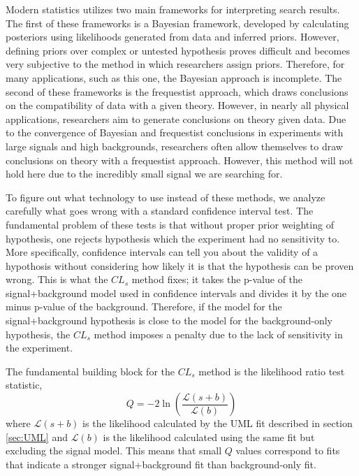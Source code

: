 Modern statistics utilizes two main frameworks for interpreting search results. The first of these frameworks is a Bayesian framework, developed by calculating posteriors using likelihoods generated from data and inferred priors. However, defining priors over complex or untested hypothesis proves difficult and becomes very subjective to the method in which researchers assign priors. Therefore, for many applications, such as this one, the Bayesian approach is incomplete. The second of these frameworks is the frequestist approach, which draws conclusions on the compatibility of data with a given theory. However, in nearly all physical applications, researchers aim to generate conclusions on theory given data. Due to the convergence of Bayesian and frequestist conclusions in experiments with large signals and high backgrounds, researchers often allow themselves to draw conclusions on theory with a frequestist approach. However, this method will not hold here due to the incredibly small signal we are searching for.

To figure out what technology to use instead of these methods, we analyze carefully what goes wrong with a standard confidence interval test. The fundamental problem of these tests is that without proper prior weighting of hypothesis, one rejects hypothesis which the experiment had no sensitivity to. More specifically, confidence intervals can tell you about the validity of a hypothosis without considering how likely it is that the hypothesis can be proven wrong. This is what the $CL_s$ method fixes; it takes the p-value of the signal+background model used in confidence intervals and divides it by the one minus p-value of the background. Therefore, if the model for the signal+background hypothesis is close to the model for the background-only hypothesis, the $CL_s$ method imposes a penalty due to the lack of sensitivity in the experiment. 

The fundamental building block for the $CL_s$ method is the likelihood ratio test statistic, 
\begin{equation}
    Q = -2 \ln \left(\frac{\mathcal{L}(s+b)}{\mathcal{L}(b)}\right)
\end{equation}
where $\mathcal{L}(s+b)$ is the likelihood calculated by the UML fit described in section \ref{sec:UML} and $\mathcal{L}(b)$ is the likelihood calculated using the same fit but excluding the signal model. This means that small $Q$ values correspond to fits that indicate a stronger signal+background fit than background-only fit. 

